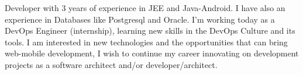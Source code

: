 %
%
%
\par{
Developer with 3 years of experience in JEE and Java-Android. I have also an experience in Databases like Postgresql and Oracle. I'm working today as a DevOps Engineer (internship), learning new skills in the DevOps Culture and its tools. I am interested in new technologies and the opportunities that can bring web-mobile development, I wish to continue my career innovating on development projects as a software architect and/or developer/architect.
}
